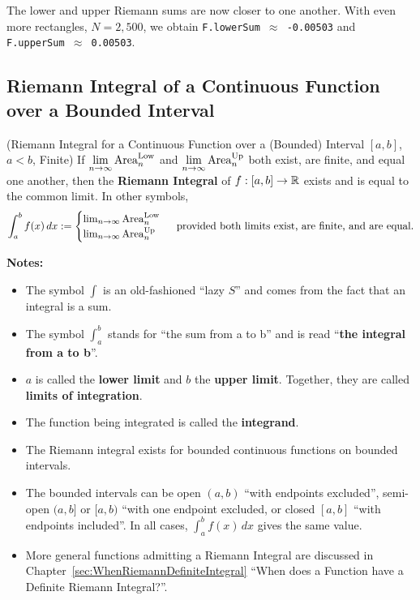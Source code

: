 \bigskip
The lower and upper Riemann sums are now closer to one another. With even more rectangles, $N=2,500$, we obtain \texttt{F.lowerSum $\approx$ -0.00503} and \texttt{F.upperSum $\approx$ 0.00503}.
\bigskip

\subsection{Riemann Integral of a Continuous Function over a Bounded Interval}

\begin{tcolorbox}[colback=mylightblue, title = {\bf Riemann Integral}, breakable]

\begin{definition}
\label{def:RiemannIntegral4ContinuousFunctions}
(Riemann Integral for a Continuous Function over a (Bounded) Interval $[a, b]$, $a < b$, Finite)
If $\displaystyle \lim_{n \to \infty} {\rm Area}^{\rm Low}_n$ and $\displaystyle \lim_{n \to \infty} {\rm Area}^{\rm Up}_n$ both exist, are finite, and equal one another, then the  \textbf{Riemann Integral} of $f:[a, b] \to \mathbb R$ exists and is equal to the common limit. In other symbols,
\begin{equation}
    \int_{a}^{b} f(x)\, dx := \begin{cases} \lim_{n \to \infty} {\rm Area}^{\rm Low}_n \\
    \lim_{n \to \infty} {\rm Area}^{\rm Up}_n 
    \end{cases} \text{ provided both limits exist, are finite, and are equal}.
\end{equation}

\end{definition}

\textbf{Notes:}
\begin{itemize}
    \item The symbol $\int$ is an old-fashioned ``lazy $S$'' and comes from the fact that an integral is a sum. 
    \item The symbol $\int_{a}^{b}$ stands for ``the sum from a to b'' and is read ``\textbf{the integral from a to b}''. 
    \item $a$ is called the \textbf{lower limit} and $b$ the \textbf{upper limit}. Together, they are called \textbf{limits of integration}.
    \item The function being integrated is called the \textbf{integrand}.
    \item The Riemann integral exists for bounded continuous functions on bounded intervals.
    \item The bounded intervals can be open $(a, b)$ ``with endpoints excluded'', semi-open $(a, b]$ or $[a, b)$ ``with one endpoint excluded, or closed $[a, b]$ ``with endpoints included''. In all cases, $\int_{a}^{b} f(x)\, dx$ gives the same value. 
    \item More general functions admitting a Riemann Integral are discussed in Chapter~\ref{sec:WhenRiemannDefiniteIntegral} ``When does a Function have a Definite Riemann Integral?''.
\end{itemize}
\end{tcolorbox}

